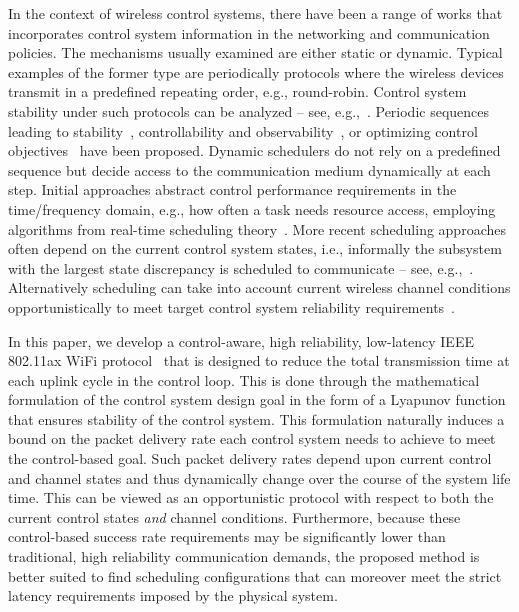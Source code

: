 In the context of wireless control systems, there have been a range of works that incorporates control system information in the networking and communication policies.
%
The mechanisms usually examined are either static or dynamic. Typical examples of the former type are periodically protocols where the wireless devices transmit in a predefined repeating order, e.g., round-robin. Control system stability under such protocols can be analyzed -- see, e.g.,~\cite{Hespanha_survey, Schenato_foundations, Donkers_switched, Branicky_stability}. Periodic sequences leading to stability~\cite{Hristu_shared_feedback}, controllability and observability~\cite{Hristu_communication_control}, or optimizing control objectives~\cite{LeNy_resource_LQR,Meier_measurement_control, Scheduling_control_combinatorics} have been proposed.
%
Dynamic schedulers do not rely on a predefined sequence but decide access to the communication medium dynamically at each step. %
Initial approaches abstract control performance requirements in the time/frequency domain, e.g., how often a task needs resource access, employing algorithms from real-time scheduling theory~\cite{Branicky_RM, Liu_Real_time_systems}. More recent scheduling approaches often depend on the current control system states, i.e., informally the subsystem with the largest state discrepancy is scheduled to communicate -- see, e.g.,~\cite{Donkers_switched,  Cervin_event_scheduling, mamduhi2014event,shi2011optimal,han2017optimal}.
%
Alternatively scheduling can take into account current wireless channel conditions opportunistically to meet target control system reliability requirements~\cite{GatsisEtal15}. 



In this paper, we develop a control-aware, high reliability, low-latency IEEE 802.11ax WiFi protocol~\cite{bellalta2016ieee} that is designed to reduce the total transmission time at each uplink cycle in the control loop. This is done through the mathematical formulation of the control system design goal in the form of a Lyapunov function that ensures stability of the control system. This formulation naturally induces a bound on the packet delivery rate each control system needs to achieve to meet the control-based goal. Such packet delivery rates depend upon current control and channel states and thus dynamically change over the course of the system life time. This can be viewed as an opportunistic protocol with respect to both the current control states \emph{and} channel conditions. Furthermore, because these control-based success rate requirements may be significantly lower than traditional, high reliability communication demands, the proposed method is better suited to find scheduling configurations that can moreover meet the strict latency requirements imposed by the physical system. 

